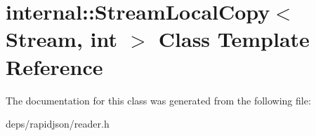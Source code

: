 \hypertarget{classinternal_1_1_stream_local_copy}{}\section{internal\+:\+:Stream\+Local\+Copy$<$ Stream, int $>$ Class Template Reference}
\label{classinternal_1_1_stream_local_copy}


The documentation for this class was generated from the following file\+:\begin{DoxyCompactItemize}
\item 
deps/rapidjson/reader.\+h\end{DoxyCompactItemize}
